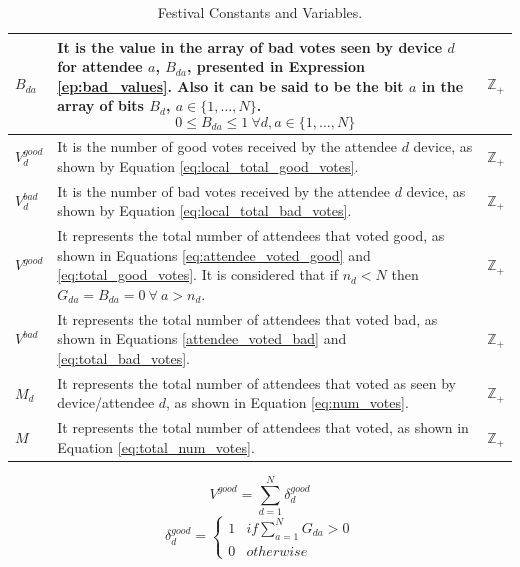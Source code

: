 \begin{table}[!ht]
\begin{tabular}{|p{.5cm}|p{5.7cm}|r| }
		 \hline
		 	$B_{da}$ & It is the value in the array of bad votes seen by device $d$ for attendee $a$, $B_{da}$, presented in Expression \ref{ep:bad_values}. Also it can be said to be the bit $a$ in the array of bits $B_{d}$, $a \in \{1,\dots, N\}$.
				\begin{equation} \label{ep:bad_values}
					0 \le B_{da} \le 1 ~ \forall d, a \in \{1,\dots, N\}
				\end{equation} & 
			$\mathbb{Z}_{+}$ \\
		\hline
			$V^{good}_{d}$ & It is the number of good votes received by the attendee $d$ device, as shown by Equation \ref{eq:local_total_good_votes}. & $\mathbb{Z}_{+}$ \\
		\hline
			$V^{bad}_{d}$ & It is the number of bad votes received by the attendee $d$ device, as shown by Equation \ref{eq:local_total_bad_votes}. & $\mathbb{Z}_{+}$ \\
		\hline
			$V^{good}$ & It represents the total number of attendees that voted good, as shown in Equations  \ref{eq:attendee_voted_good} and \ref{eq:total_good_votes}. It is considered that if $n_{d} < N$ then $G_{da} = B_{da} = 0 ~ \forall ~ a > n_{d}$. & $\mathbb{Z}_{+}$ \\
		\hline
			$V^{bad}$ & It represents the total number of attendees that voted bad, as shown in Equations \ref{attendee_voted_bad} and \ref{eq:total_bad_votes}. & $\mathbb{Z}_{+}$ \\
		\hline
			$M_{d}$ & It represents the total number of attendees that voted as seen by device/attendee $d$, as shown in Equation \ref{eq:num_votes}. & $\mathbb{Z}_{+}$ \\
		\hline
			$M$ & It represents the total number of attendees that voted, as shown in Equation \ref{eq:total_num_votes}. & $\mathbb{Z}_{+}$ \\
		\hline
	\end{tabular}
			
	\caption{Festival Constants and Variables.}
	\label{tab:festival_constants_variables}
\end{table}
\begin{equation} \label{eq:total_good_votes}
	V^{good}  = \sum^{N}_{d=1} \delta^{good}_{d}
\end{equation}
\begin{equation} \label{eq:attendee_voted_good}
	\delta^{good}_{d} = \left\{\begin{array}{ll}
			1 & if \sum^{N}_{a=1} G_{da} > 0\\
			0 & otherwise
		\end{array}
	\right.
\end{equation}
